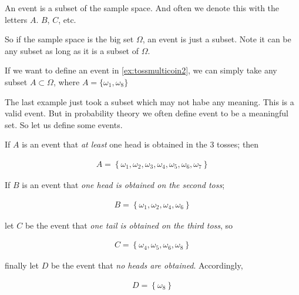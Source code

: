 \documentclass[ 11pt,%
				a4paper,%
				oneside,%
				headinclude,%
				footinclude = true,%
				cleardoublepage = empty,%
				reqno]{scrbook}
\begin{document}
		\begin{definition}[Event]
		An event is a subset of the sample space. And often we denote this with the letters $A$. $B$, $C$, etc.
		\end{definition}

		So if the sample space is the big set $\Omega$, an event is just a subset. Note it can be any subset as long as it is a subset of $\Omega$.

		\begin{example}[]
			If we want to define an event in \cref{ex:tossmulticoin2}, we can simply take any subset $A \subset \Omega$, where $A = \{\omega_1, \omega_8\}$
		\end{example}

		The last example just took a subset which may not habe any meaning. This is a valid event. But in probability theory we often define event to be a meaningful set. So let us define some events.

		\begin{example}

		If $A$ is an event that \emph{at least} one head is obtained in the 3 tosses; then 

		\begin{align*}
		A=\left\{\omega_{1}, \omega_{2}, \omega_{3}, \omega_{4}, \omega_{5}, \omega_{6}, \omega_{7}\right\}
		\end{align*}


		If $B$ is an event that \emph{one head is obtained on the second toss}; 

		\begin{align*}
			B=\left\{\omega_{1}, \omega_{2}, \omega_{4}, \omega_{6}\right\}
		\end{align*}


		let $C$ be the event that \emph{one tail is obtained on the third toss}, so

		\begin{align*}
			C=\left\{\omega_{4}, \omega_{5}, \omega_{6}, \omega_{8}\right\} 
		\end{align*}

		finally let $D$ be the event that \emph{no heads are obtained}. Accordingly,

		\begin{align*}
			D=\left\{\omega_{8}\right\}
		\end{align*}
			
		\end{example}
\end{document}
